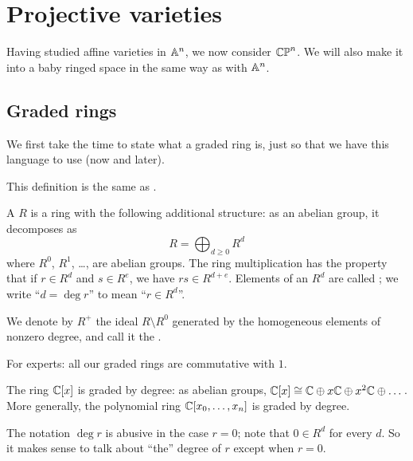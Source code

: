 \chapter{Projective varieties}
\label{ch:projective_varieties}
Having studied affine varieties in $\mathbb A^n$, we now consider $\mathbb{CP}^n$.
We will also make it into a baby ringed space
in the same way as with $\mathbb A^n$.

\section{Graded rings}
We first take the time to state what a graded ring is,
just so that we have this language to use (now and later).

This definition is the same as .

\begin{definition}
	A  $R$ is a ring with the following additional structure:
	as an abelian group, it decomposes as
	\[ R = \bigoplus_{d \ge 0} R^d \]
	where $R^0$, $R^1$, \dots, are abelian groups.
	The ring multiplication has the property that
	if $r \in R^d$ and $s \in R^e$, we have $rs \in R^{d+e}$.
	Elements of an $R^d$ are called ;
	we write ``$d = \deg r$'' to mean ``$r \in R^d$''.

	We denote by $R^+$ the ideal $R \setminus R^0$ generated by
	the homogeneous elements of nonzero degree,
	and call it the .
\end{definition}
\begin{remark}
	For experts: all our graded rings are commutative with $1$.
\end{remark}
\begin{example}
	\listhack
	\begin{enumerate}[(a)]
		\ii The ring $\mathbb C[x]$ is graded by degree: as abelian groups,
		$\mathbb C[x] \cong \mathbb C \oplus x\mathbb C \oplus x^2\mathbb C \oplus \dots$.
		\ii More generally, the polynomial ring $\mathbb C[x_0, \dots, x_n]$
		is graded by degree.
	\end{enumerate}
\end{example}
\begin{abuse}
	The notation $\deg r$ is abusive in the case $r = 0$;
	note that $0 \in R^d$ for every $d$.
	So it makes sense to talk about ``the'' degree of $r$
	except when $r = 0$.
\end{abuse}

